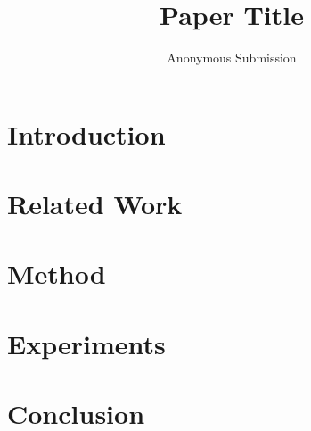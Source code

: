 \documentclass[letterpaper]{article}
\title{Paper Title}
\author{
    Anonymous Submission
}
\begin{document}
\maketitle

\begin{abstract}
\end{abstract}

\section{Introduction}

\section{Related Work}

\section{Method}

\section{Experiments}

\section{Conclusion}


\end{document}
